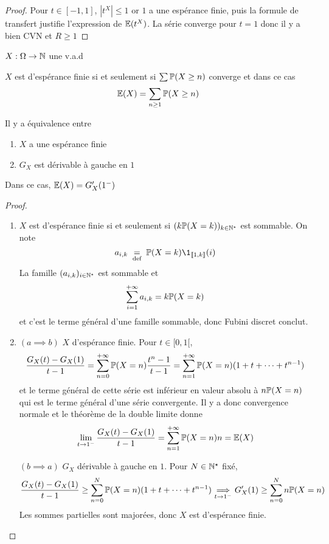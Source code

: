 \begin{proof}
    Pour $t\in [-1,1]$, $|t^X|\leq 1$ or  $1$ a une espérance finie, puis la formule de transfert justifie l'expression de  $\E(t^X)$. La série converge pour $t=1$ donc il y a bien CVN et  $R\geq 1$
\end{proof}

\begin{thm}
\Hyp $X:\Omega\to \N$ une v.a.d
\begin{concenum}
\item $X$ est d'espérance finie si et seulement si $\sum \P(X\geq n)$ converge et dans ce cas \[
        \E(X)=\sum_{n\geq 1}\P(X\geq n)
\] 
\item Il y a équivalence entre \begin{enumerate}
    \item $X$ a une espérance finie
    \item  $G_X$ est dérivable à gauche en  $1$
\end{enumerate}
Dans ce cas, $ \E(X)=G_X'(1^-)$
\end{concenum}
\end{thm}

\begin{proof}
~ \begin{enumerate}
    \item $X$ est d'espérance finie  si et seulement si $(k\P(X=k))_{k \in  \N^\star}$ est sommable. On note \[
            a_{i,k}\defeq \P(X=k)\1_{\llbracket 1,k \rrbracket }(i)
    \] 
    La famille $(a_{i,k})_{i\in \N^\star}$ est sommable et \[
        \sum_{i=1}^{+\infty} a_{i,k}=k\P(X=k)
    \] 
    et c'est le terme général d'une famille sommable, donc Fubini discret conclut.
\item $(a\implies b)$ $X$ d'espérance finie. Pour $t\in [0,1[$, \[
        \frac{G_X(t)-G_X(1)}{t-1} = \sum_{n=0}^{+\infty} \P(X=n)\frac{t^n-1}{t-1}= \sum_{n=1}^{+\infty} \P(X=n)(1+t+\cdots +t^{n-1})
\] 
et le terme général de cette série est inférieur en valeur absolu à $n\P(X=n)$ qui est le terme général d'une série convergente. Il y a donc convergence normale et le théorème de la double limite donne \[
    \lim_{t \to 1^-} \frac{G_X(t)-G_X(1)}{t-1}= \sum_{n=1}^{+\infty} \P(X=n)n=\E(X)
\] 

$(b\implies a)$ $G_X$ dérivable à gauche en $1$. Pour $N\in \N^\star$ fixé, \[
    \frac{G_X(t)-G_X(1)}{t-1}\geq \sum_{n=0}^{N} \P(X=n)(1+t+\cdots +t^{n-1}) \underset{t\to 1^-}\implies G_X'(1)\geq \sum_{n=0}^{N} n\P(X=n)
\]
Les sommes partielles sont majorées, donc $X$ est d'espérance finie.
\end{enumerate}
\end{proof}

